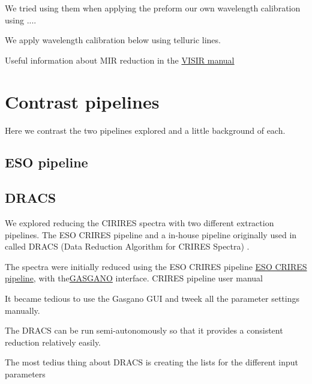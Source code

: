 We tried using them when applying the preform our own wavelength calibration using ....

We apply wavelength calibration below using telluric lines.



Useful information about MIR reduction in the 
\href{https://www.eso.org/sci/facilities/paranal/instruments/visir/doc/VLT-MAN-ESO-14300-3514_2018-02-01.pdf}{VISIR manual}


\section{Contrast pipelines}

Here we contrast the two pipelines explored and a little background of each.

\subsection{ESO pipeline}


\subsection{DRACS}


We explored reducing the CIRIRES spectra with two different extraction pipelines. The ESO CRIRES pipeline and a in-house pipeline originally used in \citet{figueira_radial_2010} called DRACS (Data Reduction Algorithm for CRIRES Spectra) .


The spectra were initially reduced using the ESO CRIRES pipeline \href{ESO CRIRES pipeline}{ESO CRIRES pipeline}, with the\href{https://www.eso.org/sci/software/gasgano.html}{GASGANO} interface.  CRIRES pipeline user manual 

It became tedious to use the Gasgano GUI and tweek all the parameter settings manually. 

The DRACS can be run semi-autonomously so that it provides a consistent reduction relatively easily.



The most tedius thing about DRACS is creating the lists for the different input parameters



